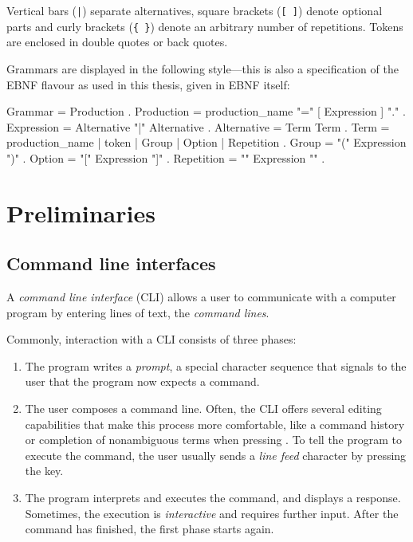 \documentclass[paper=a4,abstract=on,cleardoublepage=empty,numbers=noenddot,toc=bib,12pt,appendixprefix=true]{scrreprt}
\begin{document}
Vertical bars (\texttt{|}) separate alternatives, square brackets (\texttt{[ ]}) denote optional parts and curly brackets (\texttt{\{ \}}) denote an arbitrary number of repetitions. Tokens are enclosed in double quotes or back quotes.

Grammars are displayed in the following style---this is also a specification of the EBNF flavour as used in this thesis, given in EBNF itself:

\begin{ebnf}
Grammar     = { Production } .
Production  = production_name "=" [ Expression ] "." .
Expression  = Alternative { "|" Alternative } .
Alternative = Term { Term } .
Term        = production_name | token | Group | Option | Repetition .
Group       = "(" Expression ")" .
Option      = "[" Expression "]" .
Repetition  = "{" Expression "}" .
\end{ebnf}

\chapter{Preliminaries}
\label{sec:preliminaries}

\section{Command line interfaces}
\label{sec:cli}

A \emph{command line interface} (\textsc{CLI}) allows a user to communicate with a computer program by entering lines of text, the \emph{command lines}.

Commonly, interaction with a \textsc{CLI} consists of three phases:

\begin{enumerate}
    \item The program writes a \emph{prompt}, a special character sequence that signals to the user that the program now expects a command.
    \item The user composes a command line. Often, the CLI offers several editing capabilities that make this process more comfortable, like a command history or completion of nonambiguous terms when pressing . To tell the program to execute the command, the user usually sends a \emph{line feed} character by pressing the  key.
    \item The program interprets and executes the command, and displays a response. Sometimes, the execution is \emph{interactive} and requires further input. After the command has finished, the first phase starts again.
\end{enumerate}
\end{document}
